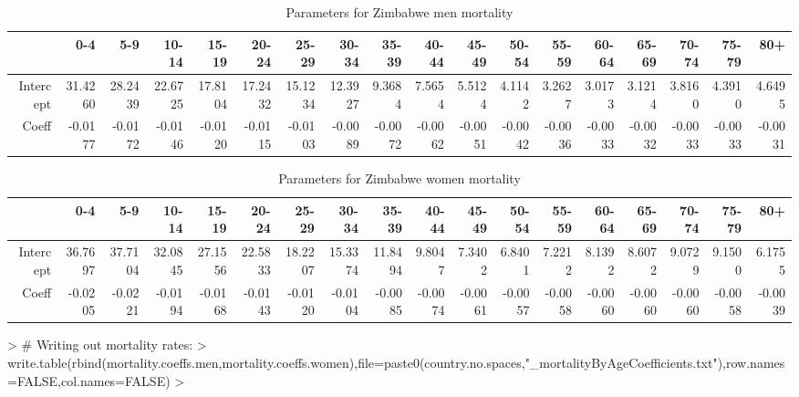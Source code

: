\documentclass{article}
\begin{document}
\begin{landscape}
\begin{table}[ht]
\centering
\begin{tabular}{rrrrrrrrrrrrrrrrrr}
  \hline
 & 0-4 & 5-9 & 10-14 & 15-19 & 20-24 & 25-29 & 30-34 & 35-39 & 40-44 & 45-49 & 50-54 & 55-59 & 60-64 & 65-69 & 70-74 & 75-79 & 80+ \\ 
  \hline
Intercept & 31.4260 & 28.2439 & 22.6725 & 17.8104 & 17.2432 & 15.1234 & 12.3927 & 9.3684 & 7.5654 & 5.5124 & 4.1142 & 3.2627 & 3.0173 & 3.1214 & 3.8160 & 4.3910 & 4.6495 \\ 
  Coeff & -0.0177 & -0.0172 & -0.0146 & -0.0120 & -0.0115 & -0.0103 & -0.0089 & -0.0072 & -0.0062 & -0.0051 & -0.0042 & -0.0036 & -0.0033 & -0.0032 & -0.0033 & -0.0033 & -0.0031 \\ 
   \hline
\end{tabular}
\caption{Parameters for Zimbabwe men mortality} 
\end{table}%
\begin{table}[ht]
\centering
\begin{tabular}{rrrrrrrrrrrrrrrrrr}
  \hline
 & 0-4 & 5-9 & 10-14 & 15-19 & 20-24 & 25-29 & 30-34 & 35-39 & 40-44 & 45-49 & 50-54 & 55-59 & 60-64 & 65-69 & 70-74 & 75-79 & 80+ \\ 
  \hline
Intercept & 36.7697 & 37.7104 & 32.0845 & 27.1556 & 22.5833 & 18.2207 & 15.3374 & 11.8494 & 9.8047 & 7.3402 & 6.8401 & 7.2212 & 8.1392 & 8.6072 & 9.0729 & 9.1500 & 6.1755 \\ 
  Coeff & -0.0205 & -0.0221 & -0.0194 & -0.0168 & -0.0143 & -0.0120 & -0.0104 & -0.0085 & -0.0074 & -0.0061 & -0.0057 & -0.0058 & -0.0060 & -0.0060 & -0.0060 & -0.0058 & -0.0039 \\ 
   \hline
\end{tabular}
\caption{Parameters for Zimbabwe women mortality} 
\end{table}

\end{landscape}


%
\begin{Schunk}
\begin{Sinput}
> # Writing out mortality rates:
> write.table(rbind(mortality.coeffs.men,mortality.coeffs.women),file=paste0(country.no.spaces,"_mortalityByAgeCoefficients.txt"),row.names=FALSE,col.names=FALSE)
> 
\end{Sinput}
\end{Schunk}
\end{document}
